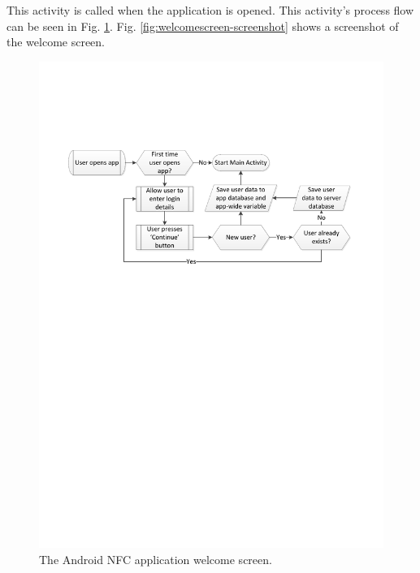 This activity is called when the application is opened. This
activity's process flow can be seen in Fig. \ref{fig:app-welcomescreen}.
Fig. \ref{fig:welcomescreen-screenshot} shows a screenshot of the welcome
screen.

\begin{figure}
 \centering 
 \includegraphics[clip = true, trim = 30 490 0 150,
 scale=0.75]{welcome_screen_processflow}
 \caption{The Android NFC application welcome screen.}
 \label{fig:app-welcomescreen}
\end{figure}

